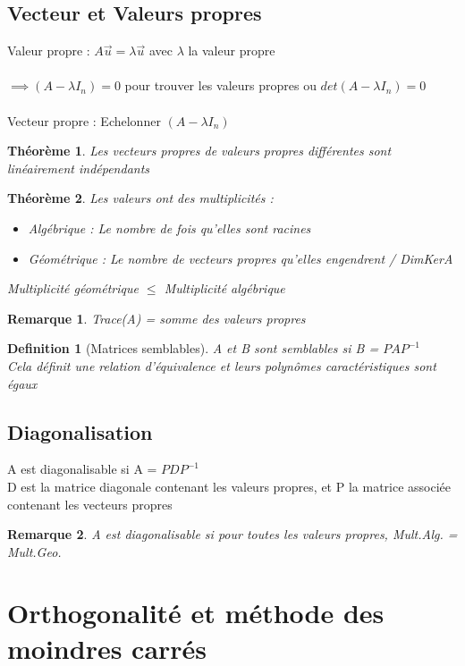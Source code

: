 \documentclass{article}
\newtheorem{definition}{Definition}[section]
\newtheorem{remark}{Remarque}[section]
\newtheorem{theorem}{Théorème}[section]
\begin{document}
\subsection{Vecteur et Valeurs propres}
Valeur propre : $A\overrightarrow{u} = \lambda\overrightarrow{u} $ avec $\lambda$ la valeur propre \\\\
$ \implies (A - \lambda I_n) = 0$ pour trouver les valeurs propres ou $det(A - \lambda I_n) = 0$ \\\\
Vecteur propre : Echelonner $(A - \lambda I_n)$
\begin{theorem}
    Les vecteurs propres de valeurs propres différentes sont linéairement indépendants
\end{theorem}
\begin{theorem}
    Les valeurs ont des multiplicités :
    \begin{itemize}
        \item Algébrique : Le nombre de fois qu'elles sont racines
        \item Géométrique : Le nombre de vecteurs propres qu'elles engendrent / DimKerA
    \end{itemize}
    Multiplicité géométrique $\leq$ Multiplicité algébrique
\end{theorem}
\begin{remark}
    Trace(A) = somme des valeurs propres
\end{remark}
\begin{definition}[Matrices semblables]
    A et B sont semblables si B = $PAP^{-1}$\\
    Cela définit une relation d'équivalence et leurs polynômes caractéristiques sont égaux
\end{definition}
\subsection{Diagonalisation}
A est diagonalisable si A = $PDP^{-1}$ \\
D est la matrice diagonale contenant les valeurs propres, et P la matrice associée contenant les vecteurs propres
\begin{remark}
    A est diagonalisable si pour toutes les valeurs propres, Mult.Alg. = Mult.Geo.
\end{remark}
\section{Orthogonalité et méthode des moindres carrés}
\end{document}
